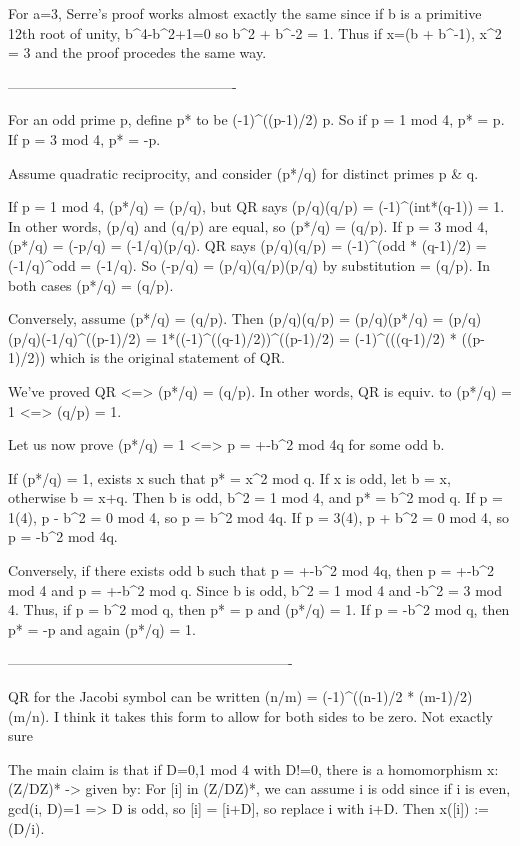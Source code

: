 For a=3, Serre's proof works almost exactly the same since if b is a primitive 12th root of unity, b^4-b^2+1=0 so b^2 + b^-2 = 1. Thus if x=(b + b^-1), x^2 = 3 and the proof procedes the same way.

-------------------------------------------------

For an odd prime p, define p* to be (-1)^((p-1)/2) p. So if p = 1 mod 4, p* = p. If p = 3 mod 4, p* = -p.

Assume quadratic reciprocity, and consider (p*/q) for distinct primes p & q.

If p = 1 mod 4, (p*/q) = (p/q), but QR says (p/q)(q/p) = (-1)^(int*(q-1)) = 1.
  In other words, (p/q) and (q/p) are equal, so (p*/q) = (q/p).
If p = 3 mod 4, (p*/q) = (-p/q) = (-1/q)(p/q). QR says
  (p/q)(q/p) = (-1)^(odd * (q-1)/2)
             = (-1/q)^odd
             = (-1/q).
  So (-p/q) = (p/q)(q/p)(p/q) by substitution
            = (q/p). In both cases (p*/q) = (q/p).

Conversely, assume (p*/q) = (q/p).
Then (p/q)(q/p) = (p/q)(p*/q)
                = (p/q)(p/q)(-1/q)^((p-1)/2)
                = 1*((-1)^((q-1)/2))^((p-1)/2)
                = (-1)^(((q-1)/2) * ((p-1)/2))
which is the original statement of QR.

We've proved QR <=> (p*/q) = (q/p).
In other words, QR is equiv. to (p*/q) = 1 <=> (q/p) = 1.

Let us now prove (p*/q) = 1 <=> p = +-b^2 mod 4q for some odd b.

If (p*/q) = 1, exists x such that p* = x^2 mod q. If x is odd,
let b = x, otherwise b = x+q. Then b is odd, b^2 = 1 mod 4, and
p* = b^2 mod q.
  If p = 1(4), p - b^2 = 0 mod 4, so p = b^2 mod 4q.
  If p = 3(4), p + b^2 = 0 mod 4, so p = -b^2 mod 4q.

Conversely, if there exists odd b such that
p = +-b^2 mod 4q, then
p = +-b^2 mod 4 and p = +-b^2 mod q.
Since b is odd, b^2 = 1 mod 4 and -b^2 = 3 mod 4.
Thus, if p = b^2 mod q, then p* = p and (p*/q) = 1.
If p = -b^2 mod q, then p* = -p and again (p*/q) = 1.

-------------------------------------------------------------

QR for the Jacobi symbol can be written
  (n/m) = (-1)^((n-1)/2 * (m-1)/2) (m/n).
I think it takes this form to allow for both sides to be zero. Not exactly sure

The main claim is that if D=0,1 mod 4 with D!=0, there is a homomorphism
x:(Z/DZ)* -> {} given by:
  For [i] in (Z/DZ)*, we can assume i is odd since if i is even, gcd(i, D)=1 => D is odd, so [i] = [i+D], so replace i with i+D. Then x([i]) := (D/i).

